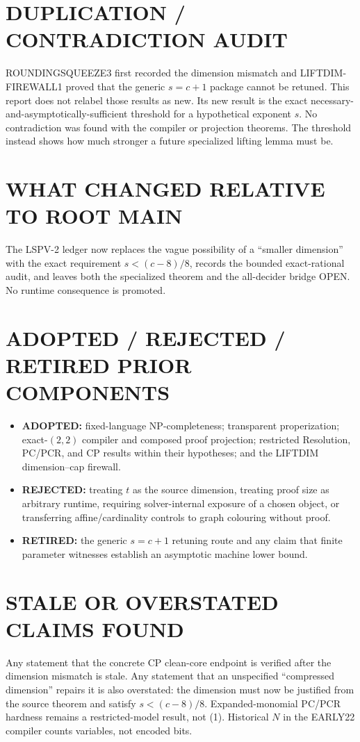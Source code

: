 \documentclass[11pt]{article}
\begin{document}
\section{DUPLICATION / CONTRADICTION AUDIT}
ROUNDINGSQUEEZE3 first recorded the dimension mismatch and
LIFTDIM-FIREWALL1 proved that the generic \(s=c+1\) package cannot be
retuned.  This report does not relabel those results as new.  Its new result
is the exact necessary-and-asymptotically-sufficient threshold for a
hypothetical exponent \(s\).  No contradiction was found with the compiler
or projection theorems.  The threshold instead shows how much stronger a
future specialized lifting lemma must be.

\section{WHAT CHANGED RELATIVE TO ROOT MAIN}
The LSPV-2 ledger now replaces the vague possibility of a ``smaller
dimension'' with the exact requirement \(s<(c-8)/8\), records the bounded
exact-rational audit, and leaves both the specialized theorem and the
all-decider bridge OPEN.  No runtime consequence is promoted.

\section{ADOPTED / REJECTED / RETIRED PRIOR COMPONENTS}
\begin{itemize}
\item \textbf{ADOPTED:} fixed-language NP-completeness; transparent
properization; exact-\((2,2)\) compiler and composed proof projection;
restricted Resolution, PC/PCR, and CP results within their hypotheses; and
the LIFTDIM dimension--cap firewall.
\item \textbf{REJECTED:} treating \(t\) as the source dimension, treating
proof size as arbitrary runtime, requiring solver-internal exposure of a
chosen object, or transferring affine/cardinality controls to graph
colouring without proof.
\item \textbf{RETIRED:} the generic \(s=c+1\) retuning route and any
claim that finite parameter witnesses establish an asymptotic machine lower
bound.
\end{itemize}

\section{STALE OR OVERSTATED CLAIMS FOUND}
Any statement that the concrete CP clean-core endpoint is verified after the
dimension mismatch is stale.  Any statement that an unspecified ``compressed
dimension'' repairs it is also overstated: the dimension must now be justified
from the source theorem and satisfy \(s<(c-8)/8\).  Expanded-monomial PC/PCR
hardness remains a restricted-model result, not (1).  Historical \(N\) in
the EARLY22 compiler counts variables, not encoded bits.
\end{document}
